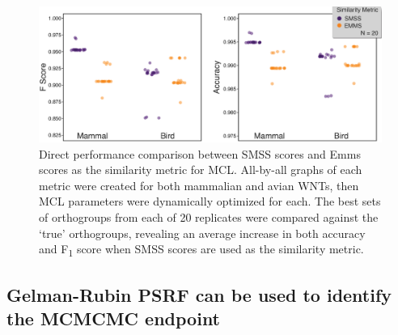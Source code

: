 \documentclass[twocolumn]{bmcart}  %
\begin{document}
\begin{figure}[t]
  \begin{center}
  \includegraphics[height=0.20\textheight]{../figures/emms_vs_smss.eps}
\end{center}
\caption{Direct performance comparison between SMSS scores and Emms scores as the similarity metric for MCL. All-by-all graphs of each metric were created for both mammalian and avian WNTs, then MCL parameters were dynamically optimized for each.
The best sets of orthogroups from each of 20 replicates were compared against the `true' orthogroups, revealing an average increase in both accuracy and F\textsubscript{1} score when SMSS scores are used as the similarity metric.}
\label{fig:emms_vs_smss}
\end{figure}


\subsection{Gelman-Rubin PSRF can be used to identify the MCMCMC endpoint}\label{subsec:gelman_rubin}
\end{document}
